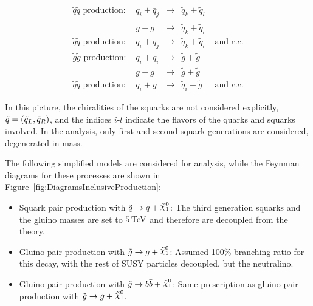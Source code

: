 \begin{equation}
\begin{matrix}
\tilde{q} \bar{\tilde{q}} \text{ production: } & q_i + \bar{q}_j &\rightarrow & \tilde{q}_k + \bar{\tilde{q}}_l & \\
& g   + g         &\rightarrow & \tilde{q}_k + \bar{\tilde{q}}_l & \\
\tilde{q} \tilde{q} \text{ production: }       & q_i + q_j       &\rightarrow & \tilde{q}_k + \tilde{q}_l & \text{ and } c.c.\\
\tilde{g} \tilde{g} \text{ production: }       & q_i + \bar{q}_i &\rightarrow & \tilde{g}   + \tilde{g} & \\
& g   + g         &\rightarrow & \tilde{g}   + \tilde{g} & \\
\tilde{q} \tilde{q} \text{ production: }       & q_i + g         &\rightarrow & \tilde{q}_i + \tilde{g} & \text{ and } c.c.
\end{matrix}
\label{eq:DirectSquarkGluinoProduction}
\end{equation}

In this picture, the chiralities of the squarks are not considered explicitly, $\tilde{q} = (\tilde{q}_L, \tilde{q}_R)$, and the indices $i$-$l$ indicate the flavors of the quarks and squarks involved.
In the analysis, only first and second squark generations are considered, degenerated in mass. 

The following simplified models are considered for analysis, while the Feynman diagrams for these processes are shown in Figure~\ref{fig:DiagramsInclusiveProduction}:

\begin{itemize}
\item{Squark pair production with $\squarktoq$: }The third generation squarks and the gluino masses are set to $\unit[5]{TeV}$ and therefore are decoupled from the theory.
\item{Gluino pair production with $\gluinotog$: }Assumed 100\% branching ratio for this decay, with the rest of SUSY particles decoupled, but the neutralino.
\item{Gluino pair production with $\gluinotobb$: }Same prescription as gluino pair production with $\gluinotog$.
\end{itemize}

